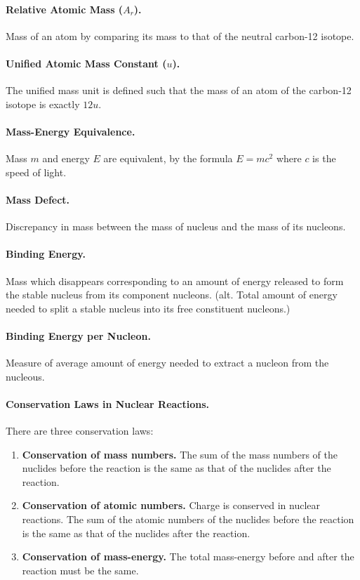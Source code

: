 \documentclass{article}
\begin{document}
\paragraph{Relative Atomic Mass ($A_r$).} Mass of an atom by comparing its mass to that of the neutral carbon-12 isotope.

\paragraph{Unified Atomic Mass Constant ($u$).} The unified mass unit is defined such that the mass of an atom of the carbon-12 isotope is exactly $12u$.

\paragraph{Mass-Energy Equivalence.} Mass $m$ and energy $E$ are equivalent, by the formula $E = mc^2$ where $c$ is the speed of light.

\paragraph{Mass Defect.} Discrepancy in mass between the mass of nucleus and the mass of its nucleons.

\paragraph{Binding Energy.} Mass which disappears corresponding to an amount of energy released to form the stable nucleus from its component nucleons. (alt. Total amount of energy needed to split a stable nucleus into its free constituent nucleons.)

\paragraph{Binding Energy per Nucleon.} Measure of average amount of energy needed to extract a nucleon from the nucleous.

\paragraph{Conservation Laws in Nuclear Reactions.} There are three conservation laws: \begin{enumerate}
\item \textbf{Conservation of mass numbers.} The sum of the mass numbers of the nuclides before the reaction is the same as that of the nuclides after the reaction.
\item \textbf{Conservation of atomic numbers.} Charge is conserved in nuclear reactions. The sum of the atomic numbers of the nuclides before the reaction is the same as that of the nuclides after the reaction.
\item \textbf{Conservation of mass-energy.} The total mass-energy before and after the reaction must be the same. 
\end{enumerate}
\end{document}
